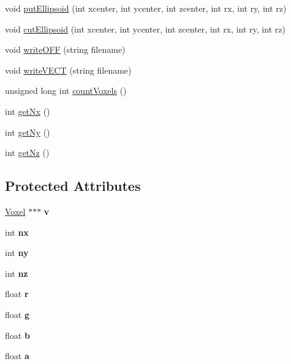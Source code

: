 \begin{DoxyCompactItemize}
\item 
void \hyperlink{classsculptor3d_a0dbd7e2f4ad70f379a38678df1fe7583}{put\+Ellipsoid} (int xcenter, int ycenter, int zcenter, int rx, int ry, int rz)
\item 
void \hyperlink{classsculptor3d_ab65ed666a86d01f428d6f735ad860cc6}{cut\+Ellipsoid} (int xcenter, int ycenter, int zcenter, int rx, int ry, int rz)
\item 
void \hyperlink{classsculptor3d_a7d9b24f6775441135936b184bb4079e0}{write\+O\+FF} (string filename)
\item 
void \hyperlink{classsculptor3d_a60f471805c52556e564477beccc72f6b}{write\+V\+E\+CT} (string filename)
\item 
unsigned long int \hyperlink{classsculptor3d_a39cb80b54a93e7e2cf8b2beddd7f1b74}{count\+Voxels} ()
\item 
int \hyperlink{classsculptor3d_a6f5974b59748b404ac44fef855dbf9ee}{get\+Nx} ()
\item 
int \hyperlink{classsculptor3d_aa354fdd753a7567f782971893f63e05a}{get\+Ny} ()
\item 
int \hyperlink{classsculptor3d_ab393938c4dfdf621eb966d73b82bf705}{get\+Nz} ()
\end{DoxyCompactItemize}
\subsection*{Protected Attributes}
\begin{DoxyCompactItemize}
\item 
\mbox{\label{classsculptor3d_aa203c37fa6a40ce6a96b818b999291f0}} 
\hyperlink{struct_voxel}{Voxel} $\ast$$\ast$$\ast$ {\bfseries v}
\item 
\mbox{\label{classsculptor3d_ae609eab63f0f21d15e2713928001212c}} 
int {\bfseries nx}
\item 
\mbox{\label{classsculptor3d_a270d21a9e67e1bf6cc7103c9c6356c0f}} 
int {\bfseries ny}
\item 
\mbox{\label{classsculptor3d_a64f2963f1cb9e3a2ce0cce2c085ca7a2}} 
int {\bfseries nz}
\item 
\mbox{\label{classsculptor3d_ac9efb16a4567c5823eb5d0e1bc44c103}} 
float {\bfseries r}
\item 
\mbox{\label{classsculptor3d_ad7e2e9e417b52b665de53ec8dbcc8388}} 
float {\bfseries g}
\item 
\mbox{\label{classsculptor3d_a183f4013dfd30806b881363dc6bef47e}} 
float {\bfseries b}
\item 
\mbox{\label{classsculptor3d_a899685e3854e58c2eb44b8a4b7f78455}} 
float {\bfseries a}
\end{DoxyCompactItemize}


